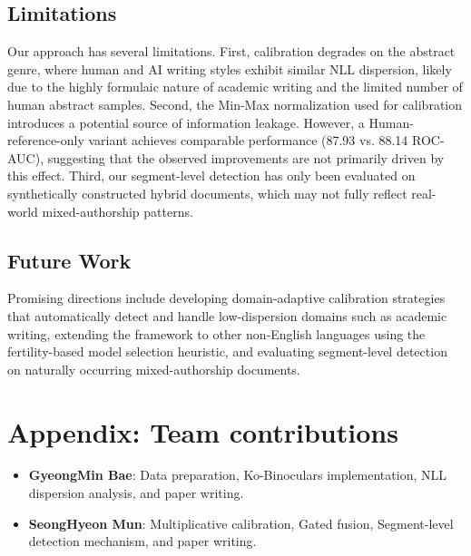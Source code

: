 \documentclass{article}
\begin{document}
\subsection{Limitations}

Our approach has several limitations. First, calibration degrades on the abstract genre, where human and AI writing styles exhibit similar NLL dispersion, likely due to the highly formulaic nature of academic writing and the limited number of human abstract samples. Second, the Min-Max normalization used for calibration introduces a potential source of information leakage. However, a Human-reference-only variant achieves comparable performance (87.93 vs. 88.14 ROC-AUC), suggesting that the observed improvements are not primarily driven by this effect. Third, our segment-level detection has only been evaluated on synthetically constructed hybrid documents, which may not fully reflect real-world mixed-authorship patterns.

\subsection{Future Work}

Promising directions include developing domain-adaptive calibration strategies that automatically detect and handle low-dispersion domains such as academic writing, extending the framework to other non-English languages using the fertility-based model selection heuristic, and evaluating segment-level detection on naturally occurring mixed-authorship documents.




\newpage
\appendix
{}

\section{Appendix: Team contributions}
\begin{itemize}
    \item \textbf{GyeongMin Bae}: Data preparation, Ko-Binoculars implementation, NLL dispersion analysis, and paper writing.
    \item \textbf{SeongHyeon Mun}: Multiplicative calibration, Gated fusion, Segment-level detection mechanism, and paper writing.
\end{itemize}
\end{document}
